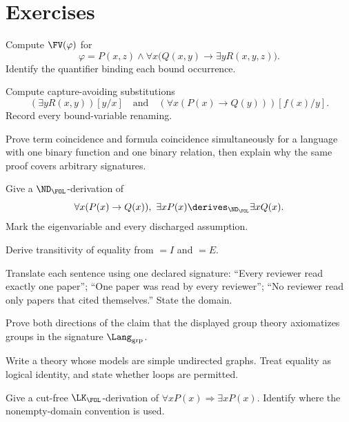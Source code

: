 \section{Exercises}
\label{sec:fol-deduction-05}

\begin{exercise}
\label{ex:fol-deduction-01}
Compute \(\FV(\varphi)\) for
\[
 \varphi=P(x,z)\land\forall x\bigl(Q(x,y)\to\exists yR(x,y,z)\bigr).
\]
Identify the quantifier binding each bound occurrence.
\end{exercise}

\begin{exercise}
\label{ex:fol-deduction-02}
Compute capture-avoiding substitutions
\[
 (\exists yR(x,y))[y/x]
 \quad\text{and}\quad
 (\forall x(P(x)\to Q(y)))[f(x)/y].
\]
Record every bound-variable renaming.
\end{exercise}

\begin{exercise}
\label{ex:fol-deduction-03}
Prove term coincidence and formula coincidence simultaneously for a language
with one binary function and one binary relation, then explain why the same
proof covers arbitrary signatures.
\end{exercise}

\begin{exercise}
\label{ex:fol-deduction-04}
Give a \(\ND_{\FOL}\)-derivation of
\[
 \forall x(P(x)\to Q(x)),\ \exists xP(x)
 \derives_{\ND_{\FOL}}\exists xQ(x).
\]
Mark the eigenvariable and every discharged assumption.
\end{exercise}

\begin{exercise}
\label{ex:fol-deduction-05}
Derive transitivity of equality from \(=I\) and \(=E\).
\end{exercise}

\begin{exercise}
\label{ex:fol-deduction-06}
Translate each sentence using one declared signature: ``Every reviewer read
exactly one paper''; ``One paper was read by every reviewer''; ``No reviewer
read only papers that cited themselves.''  State the domain.
\end{exercise}

\begin{exercise}
\label{ex:fol-deduction-07}
Prove both directions of the claim that the displayed group theory
axiomatizes groups in the signature \(\Lang_{\mathrm{grp}}\).
\end{exercise}

\begin{exercise}
\label{ex:fol-deduction-08}
Write a theory whose models are simple undirected graphs.  Treat equality as
logical identity, and state whether loops are permitted.
\end{exercise}

\begin{exercise}
\label{ex:fol-deduction-09}
Give a cut-free \(\LK_{\FOL}\)-derivation of
\(\forall xP(x)\Rightarrow\exists xP(x)\).  Identify where the nonempty-domain
convention is used.
\end{exercise}

